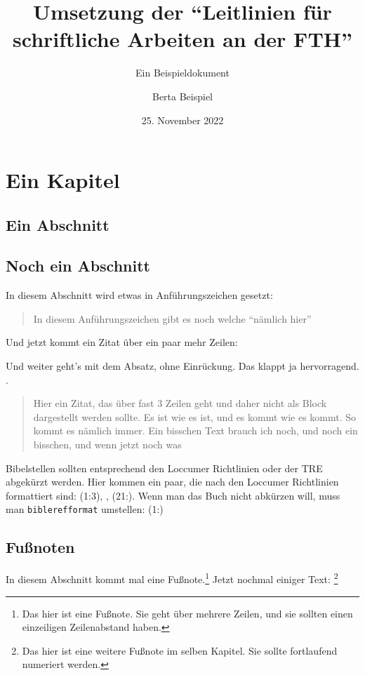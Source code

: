 \documentclass{scrreport}
\begin{document}
\title{Umsetzung der \enquote{Leitlinien für schriftliche Arbeiten an der FTH}}
\subtitle{Ein Beispieldokument}
\author{Berta Beispiel}
\date{25. November 2022}

\maketitle

\tableofcontents

\chapter{Ein Kapitel}
\section{Ein Abschnitt}
\lipsum

\section{Noch ein Abschnitt}
In diesem Abschnitt wird etwas in Anführungszeichen gesetzt: \blockquote{In diesem Anführungszeichen gibt es noch welche \enquote{nämlich hier}}. Und jetzt kommt ein Zitat über ein paar mehr Zeilen: \blockquote{\lipsum[1]} Und weiter geht's mit dem Absatz, ohne Einrückung. Das klappt ja hervorragend. \lipsum[2]. \blockquote{Hier ein Zitat, das über fast 3 Zeilen geht und daher nicht als Block dargestellt werden sollte. Es ist wie es ist, und es kommt wie es kommt. So kommt es nämlich immer. Ein bisschen Text brauch ich noch, und noch ein bisschen, und wenn jetzt noch was}

\sloppy
Bibelstellen sollten entsprechend den Loccumer Richtlinien oder der TRE abgekürzt werden. Hier kommen ein paar, die nach den Loccumer Richtlinien formattiert sind: (1:3), , (21:). Wenn man das Buch nicht abkürzen will, muss man \texttt{biblerefformat} umstellen: { (1:)}

\fussy
\section{Fußnoten}
In diesem Abschnitt kommt mal eine Fußnote.\footnote{Das hier ist eine Fußnote. Sie geht über mehrere Zeilen, und sie sollten einen einzeiligen Zeilenabstand haben. \lipsum[1]} Jetzt nochmal einiger Text: \lipsum[1-9]\footnote{Das hier ist eine weitere Fußnote im selben Kapitel. Sie sollte fortlaufend numeriert werden.}
\end{document}
